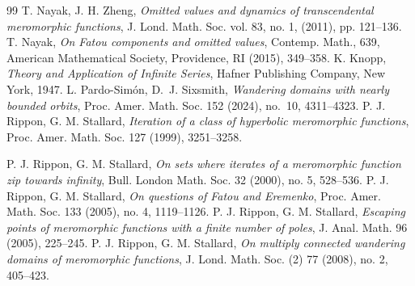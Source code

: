 \documentclass[11pt,a4paper]{article}
\begin{document}
\begin{thebibliography}{99}
	T. Nayak, J. H. Zheng, \emph{Omitted values and dynamics of transcendental meromorphic functions}, J. Lond. Math. Soc. vol. 83, no. 1, (2011), pp. 121–136.
	T. Nayak,  \emph{On Fatou components and omitted values}, Contemp. Math., 639, American Mathematical Society, Providence, RI (2015), 349–358.
	K. Knopp,  \emph{ Theory and Application of Infinite Series}, Hafner Publishing Company, New York, 1947.
		 L. Pardo-Sim\'on,  D.~J. Sixsmith, \emph{Wandering domains with nearly bounded orbits}, Proc. Amer. Math. Soc.  152 (2024), no.~10, 4311--4323.
	P. J. Rippon, G. M. Stallard, \emph{Iteration of a class of hyperbolic meromorphic functions}, Proc. Amer. Math. Soc. 127 (1999), 3251--3258.
	
	P. J. Rippon, G. M. Stallard, \emph{On sets where iterates of a meromorphic function zip towards infinity}, Bull. London Math. Soc. 32 (2000), no. 5, 528–536.
	P. J. Rippon, G. M. Stallard, \emph{On questions of Fatou and Eremenko}, Proc. Amer. Math. Soc. 133 (2005), no. 4, 1119–1126.
	P. J. Rippon, G. M. Stallard, \emph{Escaping points of meromorphic functions with a finite number of poles}, J. Anal. Math. 96 (2005), 225–245.
	P. J. Rippon, G. M. Stallard, \emph{On multiply connected wandering domains of meromorphic functions}, J. Lond. Math. Soc. (2) 77 (2008), no. 2, 405–423.
	

\end{thebibliography}
\end{document}
